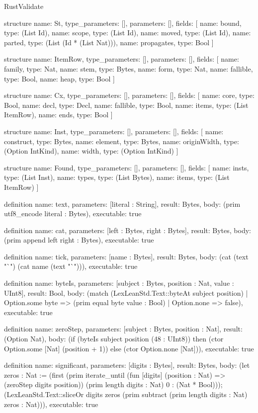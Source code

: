 \begin{lexlean}{RustValidate}
\begin{semanticmodule}
structure{
  name: St,
  type_parameters: [],
  parameters: [],
  fields: [
    {name: bound, type: (List Id)},
    {name: scope, type: (List Id)},
    {name: moved, type: (List Id)},
    {name: parted, type: (List (Id * (List Nat)))},
    {name: propagates, type: Bool}
  ]
}

structure{
  name: ItemRow,
  type_parameters: [],
  parameters: [],
  fields: [
    {name: family, type: Nat},
    {name: stem, type: Bytes},
    {name: form, type: Nat},
    {name: fallible, type: Bool},
    {name: heap, type: Bool}
  ]
}

structure{
  name: Cx,
  type_parameters: [],
  parameters: [],
  fields: [
    {name: core, type: Bool},
    {name: decl, type: Decl},
    {name: fallible, type: Bool},
    {name: items, type: (List ItemRow)},
    {name: ends, type: Bool}
  ]
}

structure{
  name: Inst,
  type_parameters: [],
  parameters: [],
  fields: [
    {name: construct, type: Bytes},
    {name: element, type: Bytes},
    {name: originWidth, type: (Option IntKind)},
    {name: width, type: (Option IntKind)}
  ]
}

structure{
  name: Found,
  type_parameters: [],
  parameters: [],
  fields: [
    {name: insts, type: (List Inst)},
    {name: types, type: (List Bytes)},
    {name: items, type: (List ItemRow)}
  ]
}

definition{
  name: text,
  parameters: [literal : String],
  result: Bytes,
  body: (prim utf8_encode literal : Bytes),
  executable: true
}

definition{
  name: cat,
  parameters: [left : Bytes, right : Bytes],
  result: Bytes,
  body: (prim append left right : Bytes),
  executable: true
}

definition{
  name: tick,
  parameters: [name : Bytes],
  result: Bytes,
  body: (cat (text "`") (cat name (text "`"))),
  executable: true
}

definition{
  name: byteIs,
  parameters: [subject : Bytes, position : Nat, value : UInt8],
  result: Bool,
  body: (match (LexLeanStd.Text::byteAt subject position)
    | Option.some byte => (prim equal byte value : Bool)
    | Option.none => false),
  executable: true
}

definition{
  name: zeroStep,
  parameters: [subject : Bytes, position : Nat],
  result: (Option Nat),
  body: (if (byteIs subject position (48 : UInt8)) then (ctor Option.some [Nat] (position + 1)) else (ctor Option.none [Nat])),
  executable: true
}

definition{
  name: significant,
  parameters: [digits : Bytes],
  result: Bytes,
  body: (let zeros : Nat := (first (prim iterate_until (fun [digits] (position : Nat) => (zeroStep digits position)) (prim length digits : Nat) 0 : (Nat * Bool))); (LexLeanStd.Text::sliceOr digits zeros (prim subtract (prim length digits : Nat) zeros : Nat))),
  executable: true
}


\end{semanticmodule}
\end{lexlean}
